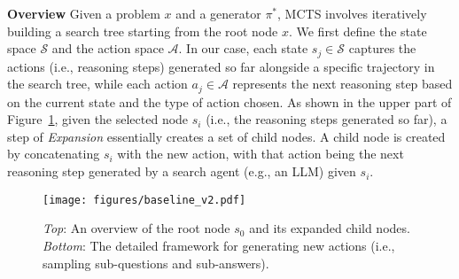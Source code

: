 \textbf{Overview}
\hspace{5pt}
Given a problem $x$ and a generator $\pi^*$, MCTS involves iteratively building a search tree starting from the root node $x$.
We first define the state space $\mathcal{S}$ and the action space $\mathcal{A}$. 
In our case, each state $s_j\in \mathcal{S}$ captures the actions (i.e., reasoning steps) generated so far alongside a specific trajectory in the search tree, while each action $a_j \in \mathcal{A}$ represents the next reasoning step based on the current state and the type of action chosen. 
As shown in the upper part of Figure~\ref{fig:baseline}, given the selected node $s_i$ (i.e., the reasoning steps generated so far), a step of \textit{Expansion} essentially creates a set of child nodes.
A child node is created by concatenating $s_i$ with the new action, with that action being the next reasoning step generated by a search agent (e.g., an LLM) given $s_i$.



% 






\begin{figure}[t]
\begin{center}
\centerline{\texttt{[image: figures/baseline\_v2.pdf]}}
\caption{\emph{Top}: An overview of the root node $s_0$ and its expanded child nodes. \emph{Bottom}: The detailed framework for generating new actions (i.e., sampling sub-questions and sub-answers).}
\label{fig:baseline}
\end{center}
\vskip -0.2in
\end{figure}










